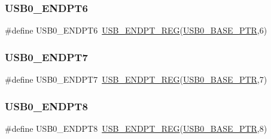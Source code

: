 \subsubsection{\texorpdfstring{U\+S\+B0\+\_\+\+E\+N\+D\+P\+T6}{USB0\_ENDPT6}}
{\footnotesize\ttfamily \#define U\+S\+B0\+\_\+\+E\+N\+D\+P\+T6~\hyperlink{group___u_s_b___register___accessor___macros_ga93e8b132ffc209ad3ba99ba2cbf4f990}{U\+S\+B\+\_\+\+E\+N\+D\+P\+T\+\_\+\+R\+EG}(\hyperlink{group___u_s_b___peripheral_ga598ff5eb20a0551af232710b3f27640a}{U\+S\+B0\+\_\+\+B\+A\+S\+E\+\_\+\+P\+TR},6)}

\mbox{\label{group___u_s_b___register___accessor___macros_gacd485ec12071351b0ab1d05423809f32}} 
\subsubsection{\texorpdfstring{U\+S\+B0\+\_\+\+E\+N\+D\+P\+T7}{USB0\_ENDPT7}}
{\footnotesize\ttfamily \#define U\+S\+B0\+\_\+\+E\+N\+D\+P\+T7~\hyperlink{group___u_s_b___register___accessor___macros_ga93e8b132ffc209ad3ba99ba2cbf4f990}{U\+S\+B\+\_\+\+E\+N\+D\+P\+T\+\_\+\+R\+EG}(\hyperlink{group___u_s_b___peripheral_ga598ff5eb20a0551af232710b3f27640a}{U\+S\+B0\+\_\+\+B\+A\+S\+E\+\_\+\+P\+TR},7)}

\mbox{\label{group___u_s_b___register___accessor___macros_gae5d029d769f9ca0fe968d53d2d185fd3}} 
\subsubsection{\texorpdfstring{U\+S\+B0\+\_\+\+E\+N\+D\+P\+T8}{USB0\_ENDPT8}}
{\footnotesize\ttfamily \#define U\+S\+B0\+\_\+\+E\+N\+D\+P\+T8~\hyperlink{group___u_s_b___register___accessor___macros_ga93e8b132ffc209ad3ba99ba2cbf4f990}{U\+S\+B\+\_\+\+E\+N\+D\+P\+T\+\_\+\+R\+EG}(\hyperlink{group___u_s_b___peripheral_ga598ff5eb20a0551af232710b3f27640a}{U\+S\+B0\+\_\+\+B\+A\+S\+E\+\_\+\+P\+TR},8)}

